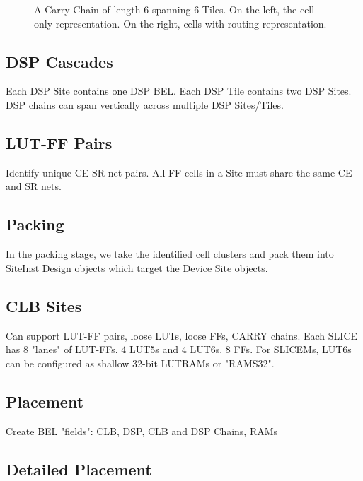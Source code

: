 \documentclass[twocolumn]{article}
\begin{document}
\begin{figure}
                \caption{A Carry Chain of length 6 spanning 6 Tiles. On the left, the cell-only representation. On the right, cells with routing representation.}
                \label{fig:device_carry_chain_routing}
            \end{figure}
        \subsection{DSP Cascades}
            Each DSP Site contains one DSP BEL.
            Each DSP Tile contains two DSP Sites.
            DSP chains can span vertically across multiple DSP Sites/Tiles.

        \subsection{LUT-FF Pairs}
            Identify unique CE-SR net pairs. All FF cells in a Site must share the same CE and SR nets.
    \subsection{Packing}
        In the packing stage, we take the identified cell clusters and pack them into SiteInst Design objects which target the Device Site objects.
        \subsection{CLB Sites}
            Can support LUT-FF pairs, loose LUTs, loose FFs, CARRY chains.
            Each SLICE has 8 "lanes" of LUT-FFs. 4 LUT5s and 4 LUT6s. 8 FFs.
            For SLICEMs, LUT6s can be configured as shallow 32-bit LUTRAMs or "RAMS32".
    \subsection{Placement}
        Create BEL "fields": CLB, DSP, CLB and DSP Chains, RAMs

        \subsection{Detailed Placement}
\end{document}
